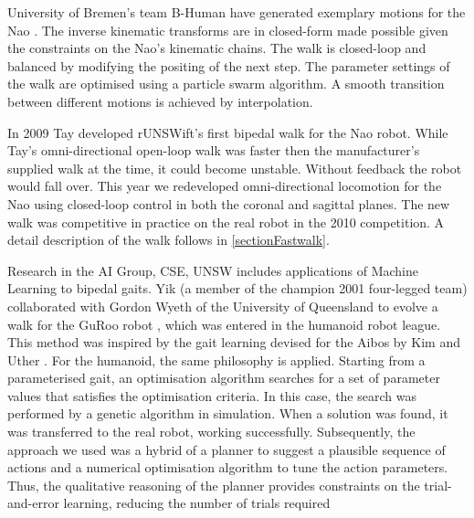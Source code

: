 \documentclass[pdftex,11pt,a4paper]{report}
\begin{document}
University of Bremen's team B-Human have generated exemplary motions for the Nao \cite{thomas09code}. The inverse kinematic transforms are in closed-form made possible  given the constraints on the Nao's kinematic chains. The walk is closed-loop and balanced by modifying the positing of the next step. The parameter settings of the walk are optimised using a particle swarm algorithm. A smooth transition between different motions is achieved by interpolation. 

In 2009 Tay developed rUNSWift's first bipedal walk \cite{aaron10walking} for the Nao robot. While Tay's omni-directional open-loop walk was faster then the manufacturer's supplied walk at the time, it could become unstable. Without feedback the robot would fall over. This year we redeveloped omni-directional locomotion for the Nao using closed-loop control in both the coronal and sagittal planes. The new walk was competitive in practice on the real robot in the 2010 competition. A detail description of the walk follows in \autoref{sectionFastwalk}. 

Research in the AI Group, CSE, UNSW includes applications of Machine Learning to bipedal gaits. Yik (a member of the champion 2001 four-legged team) collaborated with Gordon Wyeth of the University of Queensland to evolve a walk for the GuRoo robot \cite{wyeth03evolving}, which was entered in the humanoid robot league. This method was inspired by the gait learning devised for the Aibos by Kim and Uther \cite{Kim03automaticgait}. For the humanoid, the same philosophy is applied. Starting from a parameterised gait, an optimisation algorithm searches for a set of parameter values that satisfies the optimisation criteria. In this case, the search was performed by a genetic algorithm in simulation. When a solution was found, it was transferred to the real robot, working successfully. Subsequently, the approach we used was a hybrid of a planner to suggest a plausible sequence of actions and a numerical optimisation algorithm to tune the action parameters. Thus, the qualitative reasoning of the planner provides constraints on the trial-and-error learning, reducing the number of trials required \cite{yik07locomotion} \cite{DBLP:series/sci/SammutY10}
\end{document}

